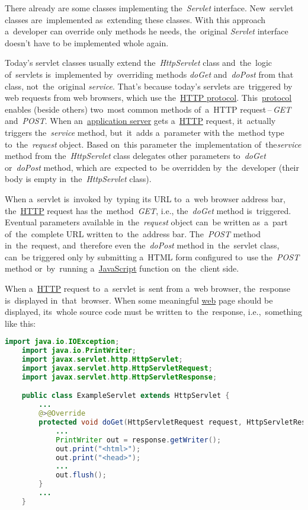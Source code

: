 There already are some classes implementing the~\textit{Servlet} interface.
New~servlet classes are~implemented as~extending these classes.
With this approach a~developer can override only methods he needs, the~original \textit{Servlet} interface doesn't have to be implemented whole again.

\label{servicedopostdoget}
 Today's servlet classes usually extend the~\textit{HttpServlet} class and~the~logic of~servlets is~implemented by~overriding methods \textit{doGet} and~\textit{doPost} from that class, not~the~original \textit{service}.
That's because today's servlets are~triggered by web requests from web browsers, which use the~\hyperref[http]{HTTP protocol}.
This~\hyperref[protocolstandard]{protocol} enables (beside others) two~most common methods of~a~HTTP request\,--\,\textit{GET} and~\textit{POST}.
When an~\hyperref[applicationserver]{application server} gets a~\hyperref[http]{HTTP} request, it~actually triggers the~\textit{service} method, but~it~adds a~parameter with the~method type to~the~\textit{request} object.
Based on~this parameter the~implementation of~the\textit{service} method from the~\textit{HttpServlet} class delegates other parameters to~\textit{doGet} or~\textit{doPost} method, which are~expected to~be overridden by~the~developer (their body is empty in~the~\textit{HttpServlet} class).

When a~servlet is~invoked by~typing its URL to~a~web browser address bar, the~\hyperref[http]{HTTP} request has the~method~\textit{GET}, i.e., the~\textit{doGet} method is~triggered.
Eventual parameters available in~the~\textit{request} object can~be written as~a~part of~the~complete URL written to~the~address bar.
The~\textit{POST} method in~the~request, and~therefore even the~\textit{doPost} method in~the~servlet class, can~be triggered only by submitting a~HTML form configured to~use the~\textit{POST} method or~by~running a~\hyperref[javascript]{JavaScript} function on~the~client side.

\label{jsp}
When a~\hyperref[http]{HTTP} request to~a~servlet is~sent from a~web browser, the~response is~displayed in~that~browser.
When some meaningful \hyperref[internetweb]{web} page should be displayed, its~whole source code must be written to~the~response, i.e.,~something like this:

\begin{lstlisting}[language=Java]
    import java.io.IOException;
    import java.io.PrintWriter;
    import javax.servlet.http.HttpServlet;
    import javax.servlet.http.HttpServletRequest;
    import javax.servlet.http.HttpServletResponse;

    public class ExampleServlet extends HttpServlet {
        ...
        @>@Override
        protected void doGet(HttpServletRequest request, HttpServletResponse response) throws IOException {
            ...
            PrintWriter out = response.getWriter();
            out.print("<html>");
            out.print("<head>");
            ...
            out.flush();
        }
        ...
    }
\end{lstlisting}

